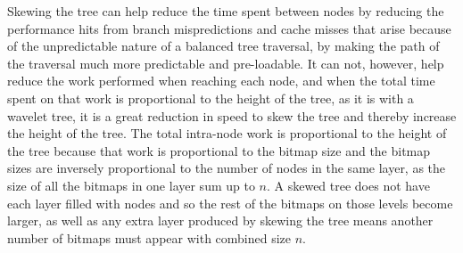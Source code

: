 Skewing the tree can help reduce the time spent between nodes by reducing the performance hits from branch mispredictions and cache misses that arise because of the unpredictable nature of a balanced tree traversal, by making the path of the traversal much more predictable and pre-loadable.
It can not, however, help reduce the work performed when reaching each node, and when the total time spent on that work is proportional to the height of the tree, as it is with a wavelet tree, it is a great reduction in speed to skew the tree and thereby increase the height of the tree.
The total intra-node work is proportional to the height of the tree because that work is proportional to the bitmap size and the bitmap sizes are inversely proportional to the number of nodes in the same layer, as the size of all the bitmaps in one layer sum up to $n$. A skewed tree does not have each layer filled with nodes and so the rest of the bitmaps on those levels become larger, as well as any extra layer produced by skewing the tree means another number of bitmaps must appear with combined size $n$.


